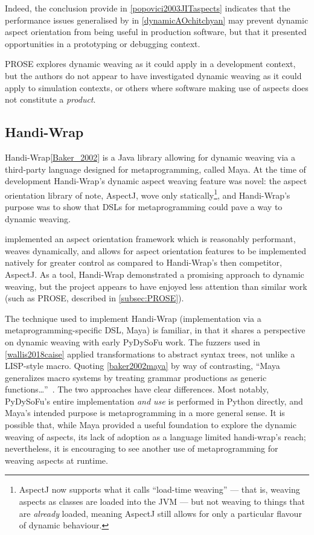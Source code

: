 Indeed, the conclusion \citeauthor{popovici2003JITaspects} provide in
\cref{popovici2003JITaspects} indicates that the performance issues generalised
by \citeauthor{dynamicAOchitchyan} in \cref{dynamicAOchitchyan} may prevent
dynamic aspect orientation from being useful in production software, but that
it presented opportunities in a prototyping or debugging context.

PROSE explores dynamic weaving as it could apply in a development context, but
the authors do not appear to have investigated dynamic weaving as it could apply
to simulation contexts, or others where software making use of aspects does not
constitute a \emph{product}.



\subsection{Handi-Wrap}
Handi-Wrap\cref{Baker_2002} is a Java library allowing for dynamic weaving via a
third-party language designed for metaprogramming, called Maya. At the time of
development Handi-Wrap's dynamic aspect weaving feature was novel: the aspect
orientation library of note, AspectJ, wove only statically\footnote{AspectJ now
supports what it calls ``load-time weaving'' --- that is, weaving aspects as
classes are loaded into the JVM --- but not weaving to things that are
\emph{already} loaded, meaning AspectJ still allows for only a particular
flavour of dynamic behaviour.}, and Handi-Wrap's purpose was to show that DSLs
for metaprogramming could pave a way to dynamic weaving.

\citeauthor{Baker_2002} implemented an aspect orientation framework which is
reasonably performant, weaves dynamically, and allows for aspect orientation
features to be implemented natively for greater control as compared to
Handi-Wrap's then competitor, AspectJ. As a tool, Handi-Wrap demonstrated a
promising approach to dynamic weaving, but the project appears to have enjoyed
less attention than similar work (such as PROSE, described in
\cref{subsec:PROSE}).

The technique used to implement Handi-Wrap (implementation via a
metaprogramming-specific DSL, Maya) is familiar, in that it shares a
perspective on dynamic weaving with early PyDySoFu work. The fuzzers used in
\cref{wallis2018caise} applied transformations to abstract syntax trees, not
unlike a LISP-style macro. Quoting \cref{baker2002maya} by way of contrasting,
{\ttfamily{}``Maya generalizes macro systems by treating grammar productions as
generic functions\ldots{}''~}. The two approaches have clear differences. Most
notably, PyDySoFu's entire implementation \emph{and use} is performed in Python
directly, and Maya's intended purpose is metaprogramming in a more general
sense. 
It is possible that, while Maya provided a useful foundation to explore the
dynamic weaving of aspects, its lack of adoption as a language limited
handi-wrap's reach; nevertheless, it is encouraging to see another use of
metaprogramming for weaving aspects at runtime.


